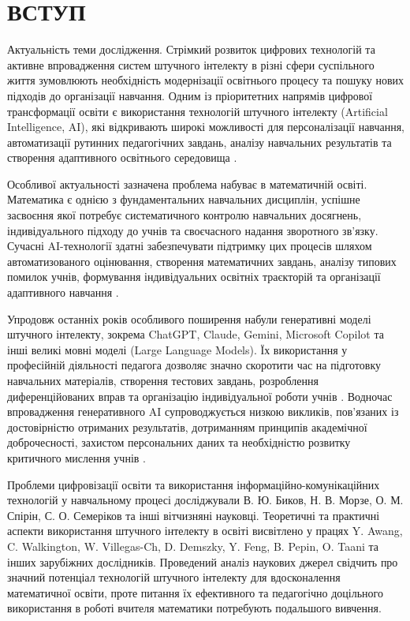 \newpage


\section*{ВСТУП}

Актуальність теми дослідження. Стрімкий розвиток цифрових технологій та активне впровадження систем штучного інтелекту в різні сфери суспільного життя зумовлюють необхідність модернізації освітнього процесу та пошуку нових підходів до організації навчання. Одним із пріоритетних напрямів цифрової трансформації освіти є використання технологій штучного інтелекту (Artificial Intelligence, AI), які відкривають широкі можливості для персоналізації навчання, автоматизації рутинних педагогічних завдань, аналізу навчальних результатів та створення адаптивного освітнього середовища \cite{Awang2025,Walkington2025}.

Особливої актуальності зазначена проблема набуває в математичній освіті. Математика є однією з фундаментальних навчальних дисциплін, успішне засвоєння якої потребує систематичного контролю навчальних досягнень, індивідуального підходу до учнів та своєчасного надання зворотного зв'язку. Сучасні AI-технології здатні забезпечувати підтримку цих процесів шляхом автоматизованого оцінювання, створення математичних завдань, аналізу типових помилок учнів, формування індивідуальних освітніх траєкторій та організації адаптивного навчання \cite{VillegasCh2025,Feng2025}.

Упродовж останніх років особливого поширення набули генеративні моделі штучного інтелекту, зокрема ChatGPT, Claude, Gemini, Microsoft Copilot та інші великі мовні моделі (Large Language Models). Їх використання у професійній діяльності педагога дозволяє значно скоротити час на підготовку навчальних матеріалів, створення тестових завдань, розроблення диференційованих вправ та організацію індивідуальної роботи учнів \cite{Demszky2025}. Водночас впровадження генеративного AI супроводжується низкою викликів, пов'язаних із достовірністю отриманих результатів, дотриманням принципів академічної доброчесності, захистом персональних даних та необхідністю розвитку критичного мислення учнів \cite{Steinbach2025}.

Проблеми цифровізації освіти та використання інформаційно-комунікаційних технологій у навчальному процесі досліджували В. Ю. Биков, Н. В. Морзе, О. М. Спірін, С. О. Семеріков та інші вітчизняні науковці. Теоретичні та практичні аспекти використання штучного інтелекту в освіті висвітлено у працях Y. Awang, C. Walkington, W. Villegas-Ch, D. Demszky, Y. Feng, B. Pepin, O. Taani та інших зарубіжних дослідників. Проведений аналіз наукових джерел свідчить про значний потенціал технологій штучного інтелекту для вдосконалення математичної освіти, проте питання їх ефективного та педагогічно доцільного використання в роботі вчителя математики потребують подальшого вивчення.

